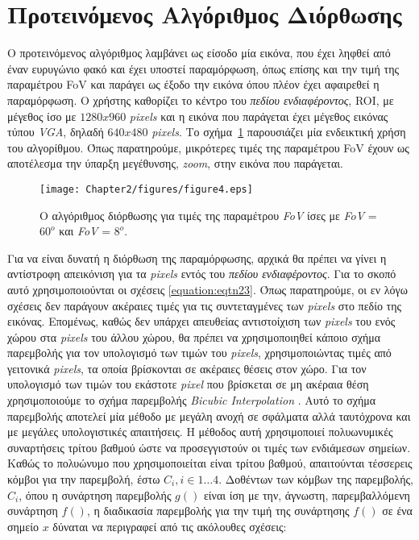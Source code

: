 \section{Προτεινόμενος Αλγόριθμος Διόρθωσης}
\label{section:sect23}
\indent
Ο προτεινόμενος αλγόριθμος λαμβάνει ως είσοδο μία εικόνα, που έχει ληφθεί από έναν ευρυγώνιο φακό και έχει υποστεί παραμόρφωση, όπως επίσης και την τιμή της παραμέτρου \ac{FoV} και παράγει ως έξοδο την εικόνα όπου πλέον έχει αφαιρεθεί η παραμόρφωση. Ο χρήστης καθορίζει το κέντρο του \textsl{πεδίου ενδιαφέροντος}, \ac{ROI}, με μέγεθος ίσο με \(1280x960\) \textsl{pixels} και η εικόνα που παράγεται έχει μέγεθος εικόνας τύπου \textsl{VGA}, δηλαδή \(640x480\) \textsl{pixels}. Το σχήμα~\ref{figure:fig24} παρουσιάζει μία ενδεικτική χρήση του αλγορίθμου. Όπως παρατηρούμε, μικρότερες τιμές της παραμέτρου \ac{FoV} έχουν ως αποτέλεσμα την ύπαρξη μεγέθυνσης, \textsl{zoom}, στην εικόνα που παράγεται.

\begin{figure}
\centering
\texttt{[image: Chapter2/figures/figure4.eps]}
\caption{Ο αλγόριθμος διόρθωσης για τιμές της παραμέτρου \textsl{FoV} ίσες με \textsl{FoV} = $60^{o}$ και \textsl{FoV} = $8^{o}$.}
\label{figure:fig24}
\end{figure}
Για να είναι δυνατή η διόρθωση της παραμόρφωσης, αρχικά θα πρέπει να γίνει η αντίστροφη απεικόνιση για τα \textsl{pixels} εντός του \textsl{πεδίου ενδιαφέροντος}. Για το σκοπό αυτό χρησιμοποιούνται οι σχέσεις \eqref{equation:eqtn23}. Όπως παρατηρούμε, οι εν λόγω σχέσεις δεν παράγουν ακέραιες τιμές για τις συντεταγμένες των \textsl{pixels} στο πεδίο της εικόνας. Επομένως, καθώς δεν υπάρχει απευθείας αντιστοίχιση των \textsl{pixels} του ενός χώρου στα \textsl{pixels} του άλλου χώρου, θα πρέπει να χρησιμοποιηθεί κάποιο σχήμα παρεμβολής για τον υπολογισμό των τιμών του \textsl{pixels}, χρησιμοποιώντας τιμές από γειτονικά \textsl{pixels}, τα οποία βρίσκονται σε ακέραιες θέσεις στον χώρο. Για τον υπολογισμό των τιμών του εκάστοτε \textsl{pixel} που βρίσκεται σε μη ακέραια θέση χρησιμοποιούμε το σχήμα παρεμβολής \textsl{Βicubic Ιnterpolation} \cite{Keyes81}.\newline \indent
Αυτό το σχήμα παρεμβολής αποτελεί μία μέθοδο με μεγάλη ανοχή σε σφάλματα αλλά ταυτόχρονα και με μεγάλες υπολογιστικές απαιτήσεις. Η μέθοδος αυτή χρησιμοποιεί πολυωνυμικές συναρτήσεις τρίτου βαθμού ώστε να προσεγγιστούν οι τιμές των ενδιάμεσων σημείων. Καθώς το πολυώνυμο που χρησιμοποιείται είναι τρίτου βαθμού, απαιτούνται τέσσερεις κόμβοι για την παρεμβολή, έστω \(C_{i}, i \in 1\dots4\). Δοθέντων των κόμβων της παρεμβολής, \(C_{i}\), όπου η συνάρτηση παρεμβολής \(g()\) είναι ίση με την, άγνωστη, παρεμβαλλόμενη συνάρτηση \(f()\), η διαδικασία παρεμβολής για την τιμή της συνάρτησης \(f()\) σε ένα σημείο \(x\) δύναται να περιγραφεί από τις ακόλουθες σχέσεις:

